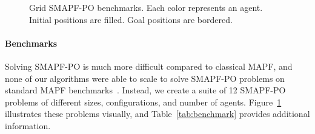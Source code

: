 \documentclass[letterpaper]{article} %
\begin{document}
\begin{figure}[ht]
{        \label{subfig:P3}}
    \caption{Grid SMAPF-PO benchmarks. Each color represents an agent. Initial positions are filled. Goal positions are bordered.}
    \label{fig:multi-problems}
\end{figure}


\paragraph{Benchmarks}
Solving SMAPF-PO is much more difficult compared to classical MAPF, and none of our algorithms were able to scale to solve SMAPF-PO problems on standard MAPF benchmarks~\cite{stern2019mapf}. 
Instead, we create a suite of 12 SMAPF-PO problems of different sizes, configurations, and number of agents. Figure~\ref{fig:multi-problems} illustrates these problems visually, and Table~\ref{tab:benchmark} provides additional information. 
\end{document}
